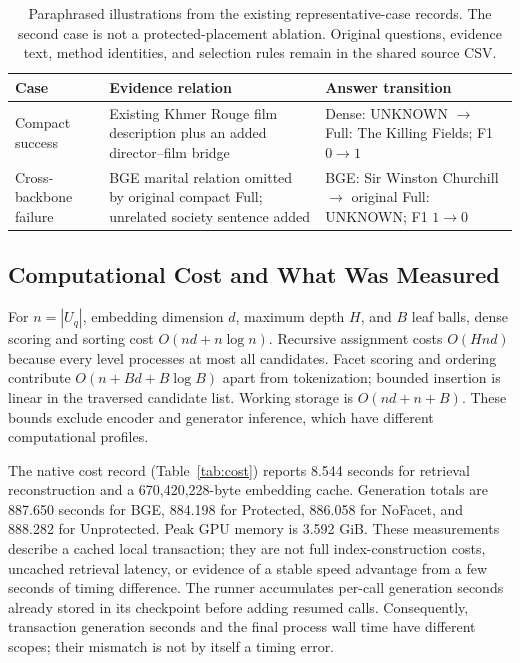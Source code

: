 \documentclass[11pt,a4paper]{article}
\begin{document}
\begin{table}[t]
\centering\small
\begin{tabular}{@{}p{}p{}p{}@{}}
\toprule
Case & Evidence relation & Answer transition\\
\midrule
Compact success & Existing Khmer Rouge film description plus an added
director--film bridge & Dense: UNKNOWN $\rightarrow$ Full: The Killing
Fields; F1 $0\rightarrow1$\\
Cross-backbone failure & BGE marital relation omitted by original compact
Full; unrelated society sentence added & BGE: Sir Winston Churchill
$\rightarrow$ original Full: UNKNOWN; F1 $1\rightarrow0$\\
\bottomrule
\end{tabular}
\caption{Paraphrased illustrations from the existing representative-case
records. The second case is not a protected-placement ablation. Original
questions, evidence text, method identities, and selection rules remain in
the shared source CSV.}
\label{tab:cases}
\end{table}

\subsection{Computational Cost and What Was Measured}
For $n=|U_q|$, embedding dimension $d$, maximum depth $H$, and $B$ leaf
balls, dense scoring and sorting cost $O(nd+n\log n)$. Recursive assignment
costs $O(Hnd)$ because every level processes at most all candidates.
Facet scoring and ordering contribute $O(n+Bd+B\log B)$ apart from
tokenization; bounded insertion is linear in the traversed candidate list.
Working storage is $O(nd+n+B)$. These bounds exclude encoder and generator
inference, which have different computational profiles.

The native cost record (Table~\ref{tab:cost}) reports 8.544 seconds for retrieval
reconstruction and a 670,420,228-byte embedding cache. Generation totals are
887.650 seconds for BGE, 884.198 for Protected, 886.058 for NoFacet, and
888.282 for Unprotected. Peak GPU memory is 3.592 GiB. These measurements
describe a cached local transaction; they are not full index-construction
costs, uncached retrieval latency, or evidence of a stable speed advantage
from a few seconds of timing difference.
The runner accumulates per-call generation seconds already stored in its
checkpoint before adding resumed calls. Consequently, transaction generation
seconds and the final process wall time have different scopes; their mismatch
is not by itself a timing error.
\end{document}
